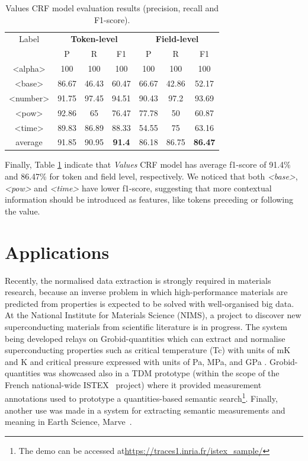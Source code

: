\documentclass[sigconf]{acmart}
\begin{document}
\begin{table}[ht]
  \caption{Values CRF model evaluation results (precision, recall and F1-score).}
  \label{tab:values-evaluation}
  \begin{tabular}{c|ccc|ccc}
    \toprule
    Label & \multicolumn{3}{c}{\textbf{Token-level}} & \multicolumn{3}{c}{\textbf{Field-level}}\\
    & P & R & F1 & P & R & F1 \\
    \midrule
    <alpha>       & 100   & 100   & 100   & 100   & 100   & 100     \\
    <base>        & 86.67 & 46.43 & 60.47 & 66.67 & 42.86 & 52.17   \\
    <number>      & 91.75 & 97.45 & 94.51 & 90.43 & 97.2  & 93.69   \\
    <pow>         & 92.86 & 65    & 76.47 & 77.78 & 50    & 60.87   \\
    <time>        & 89.83 & 86.89 & 88.33 & 54.55 & 75    & 63.16   \\
    \midrule
    average       & 91.85 & 90.95 & \textbf{91.4} & 86.18 & 86.75 & \textbf{86.47}   \\
    \bottomrule
     \end{tabular}
\end{table}

Finally, Table \ref{tab:values-evaluation} indicate that \textit{Values} CRF model has average f1-score of 91.4\% and 86.47\% for token and field level, respectively. We noticed that both \textit{<base>}, \textit{<pow>} and \textit{<time>} have lower f1-score, suggesting that more contextual information should be introduced as features, like tokens preceding or following the value. 

\section{Applications}
\label{sec:use_cases}
Recently, the normalised data extraction is strongly required in materials research, because an inverse problem in which high-performance materials are predicted from properties is expected to be solved with well-organised big data. At the National Institute for Materials Science (NIMS), a project to discover new superconducting materials from scientific literature is in progress. The system being developed relays on Grobid-quantities which can extract and normalise superconducting properties such as critical temperature (Tc) with units of mK and K and critical pressure expressed with units of Pa, MPa, and GPa \cite{foppiano2019proposal}. Grobid-quantities was showcased also in a TDM prototype (within the scope of the French national-wide ISTEX~\cite{dazy2014istex} project) where it provided measurement annotations used to prototype a quantities-based semantic search\footnote{The demo can be accessed at\url{https://traces1.inria.fr/istex_sample/}}. Finally, another use was made in a system for extracting semantic measurements and meaning in Earth Science, Marve~\cite{hundman2017measurement}.  
\end{document}
